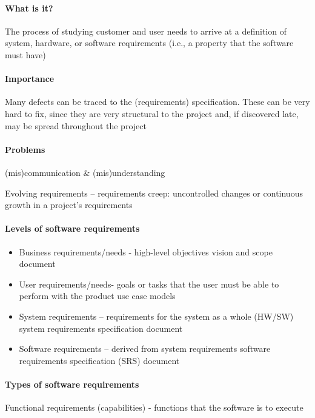 \documentclass[../ESOF_notes.tex]{subfiles}
\begin{document}
 

\paragraph{What is it?}

The process of studying customer and user needs to arrive at a definition of system, hardware, or software requirements (i.e., a property that the software must have)

\paragraph{Importance} 
Many defects can be traced to the (requirements) specification. These can be very hard to fix, since they are very structural to the project and, if discovered late, may be spread throughout the project

\paragraph{Problems}

(mis)communication \& (mis)understanding

Evolving requirements – requirements creep: uncontrolled changes or continuous growth in a project’s requirements

\paragraph{Levels of software requirements}
\begin{itemize}
    \item Business requirements/needs - high-level objectives
    vision and scope document
    \item User requirements/needs- goals or tasks that the user must be able to perform with the product
    use case models
    \item System requirements – requirements for the system as a whole (HW/SW)
    system requirements specification document
    \item Software requirements – derived from system requirements
    software requirements specification (SRS) document
\end{itemize}

\paragraph{Types of software requirements}
Functional requirements (capabilities) - functions that the software is to execute
\end{document}
